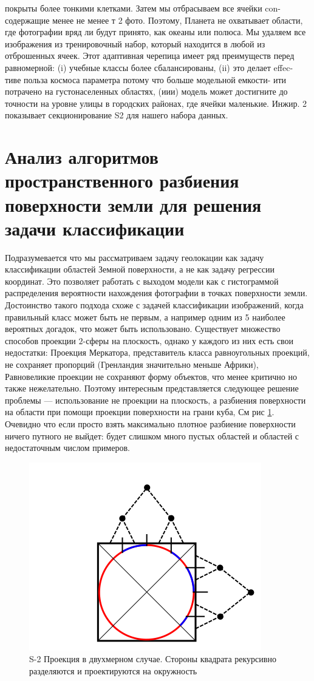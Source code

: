 покрыты более тонкими клетками. Затем мы отбрасываем все ячейки con-
содержащие менее не менее т 2 фото. Поэтому, Планета
не охватывает области, где фотографии вряд ли будут
принято, как океаны или полюса. Мы удаляем все изображения из
тренировочный набор, который находится в любой из отброшенных ячеек. Этот
адаптивная черепица имеет ряд преимуществ перед равномерной:
(i) учебные классы более сбалансированы, (ii) это делает effec-
тиве польза космоса параметра потому что больше модельной емкости-
ити потрачено на густонаселенных областях, (иии) модель может
достигните до точности на уровне улицы в городских районах, где ячейки
маленькие. Инжир. 2 показывает секционирование S2 для нашего набора данных.
	
\section{Анализ алгоритмов пространственного разбиения поверхности земли для решения задачи классификации }

Подразумевается что мы рассматриваем задачу геолокации как задачу классификации областей Земной поверхности, а не как задачу регрессии координат. Это позволяет работать с выходом модели как с гистограммой распределения вероятности нахождения фотографии в точках поверхности земли.
Достоинство такого подхода схоже с задачей классификации изображений, когда правильный класс может быть не первым, а например одним из 5 наиболее вероятных догадок, что может быть использовано.
Существует множество способов проекции $2$-сферы на плоскость, однако у каждого из них есть свои недостатки:
Проекция Меркатора, представитель класса равноугольных проекций, не сохраняет пропорций (Гренландия значительно меньше Африки), Равновеликие проекции не сохраняют форму объектов, что менее критично но также нежелательно.
Поэтому интересным представляется следующее решение проблемы --- использование не проекции  на плоскость, а разбиения поверхности на области при помощи проекции поверхности на грани куба, См рис \ref{pic:projection}. Очевидно что если просто взять максимально плотное разбиение поверхности ничего путного не выйдет: будет слишком много пустых областей и областей с недостаточным числом примеров.
\begin{figure}
	\centering
	\includegraphics{img/projection}
	\caption{S-2 Проекция в двухмерном случае. Стороны квадрата рекурсивно разделяются и проектируются на окружность}
	\label{pic:projection}
\end{figure}

